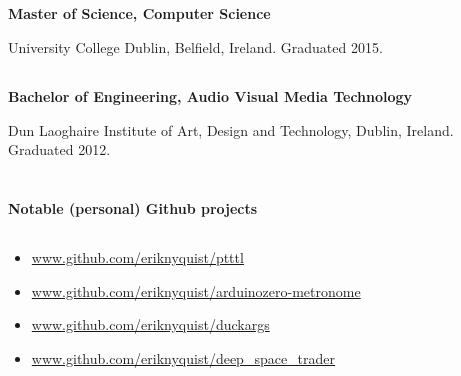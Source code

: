 \documentclass[6pt]{article}
\begin{document}
\begin{minipage}{38em}
\dotfill
\vspace{-0.8em}
\subsection*{}
\begin{flushleft}
{\bfseries Master of Science, Computer Science}

University College Dublin, Belfield, Ireland. Graduated 2015.

\subsection*{}
{\bfseries Bachelor of Engineering, Audio Visual Media Technology}

Dun Laoghaire Institute of Art, Design and Technology, Dublin, Ireland. Graduated 2012.
\end{flushleft}

\section*{}
{\Large \bfseries Notable (personal) Github projects}

\dotfill
\vspace{-0.8em}
\subsection*{}
\begin{itemize}
    \setlength\itemsep{0em}
    \item \url{www.github.com/eriknyquist/ptttl}
    \item \url{www.github.com/eriknyquist/arduinozero-metronome}
    \item \url{www.github.com/eriknyquist/duckargs}
    \item \url{www.github.com/eriknyquist/deep\_space\_trader}
\end{itemize}

\end{minipage}
\end{document}
